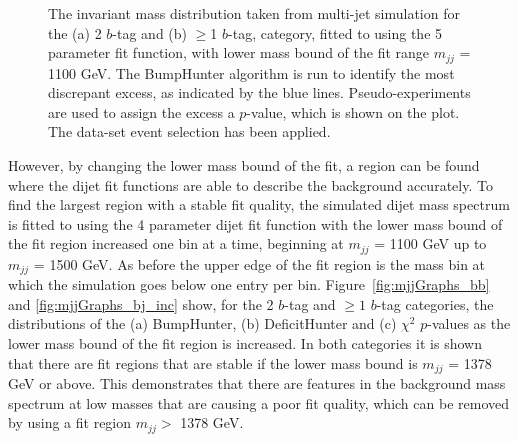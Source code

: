 \begin{figure}[!ht]
  \begin{center}
    \captionsetup[subfigure]{aboveskip=0pt,justification=centering}
  \end{center}
  \caption{ The invariant mass distribution taken from multi-jet simulation for the (a) 2 $b$-tag and (b) $\geq$1 $b$-tag,
    category, fitted to using the 5 parameter fit function, with lower mass bound of the fit range $m_{jj}$ = 1100 GeV.
    The BumpHunter algorithm is run to identify the most discrepant excess, as indicated by the blue lines.
    Pseudo-experiments are used to assign the excess a \mbox{$p$-value}, which is shown on the plot.
    The \summer{} data-set event selection has been applied.}
  \label{fig:Short_5para_1100_figure1}
\end{figure}

\FloatBarrier

However, by changing the lower mass bound of the fit,
a region can be found where the dijet fit functions are able to describe the background accurately.
To find the largest region with a stable fit quality, the simulated dijet mass spectrum is
fitted to using the 4 parameter dijet fit function with the lower mass bound of the fit region increased one bin at a time,
beginning at $m_{jj}$ = 1100 GeV up to $m_{jj}$ = 1500 GeV.
As before the upper edge of the fit region is the mass bin at which the simulation goes below one entry per bin.
Figure~\ref{fig:mjjGraphs_bb} and \ref{fig:mjjGraphs_bj_inc} show,
for the 2 $b$-tag and $\geq1$ $b$-tag categories, the distributions of the
(a) BumpHunter, (b) DeficitHunter and (c) $\chi^{2}$ \mbox{$p$-value}s as the lower mass bound of the fit region is increased.
In both categories it is shown that there are fit regions that are stable if the lower mass bound is $m_{jj}$ = 1378 GeV or above.
This demonstrates that there are features in the background mass spectrum at low masses that are causing a poor fit quality,
which can be removed by using a fit region $m_{jj} >$ 1378 GeV. 

